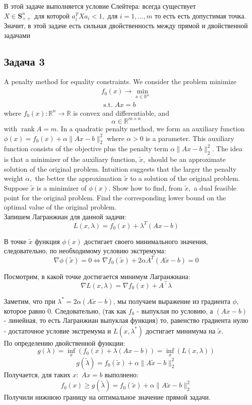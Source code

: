 \documentclass[a4paper,12pt]{article} %
\begin{document}
В этой задаче выполняется условие Слейтера: всегда существует $
X \in \mathbf{S}_{++}^{n} \text { для которой } a_{i}^{T} X a_{i} < 1, \text { для } i=1, \ldots, m
$ то есть есть допустимая точка. Значит, в этой задаче есть сильная двойственность между прямой и двойственной задачами 


\subsection*{Задача 3}
A penalty method for equality constraints. We consider the problem minimize
$$
\begin{array}{l}
f_{0}(x) \rightarrow \min\limits _{x \in \mathbb{R}^{n}} \\
\text { s.t. } A x=b
\end{array}
$$
where $f_{0}(x): \mathbb{R}^{n} \rightarrow \mathbb{R}$ is convex and differentiable, and
$$
\alpha \in \mathbb{R}^{m \times n}
$$
with $\operatorname{rank} A=m .$ In a quadratic penalty method, we form an auxiliary function $\phi(x)=f_{0}(x)+\alpha\|A x-b\|_{2}^{2}$
where $\alpha>0$ is a parameter. This auxiliary function consists of the objective plus the penalty term $\alpha\|A x-b\|_{2}^{2}$. The idea is that a minimizer of the auxiliary function, $\tilde{x},$ should be an approximate solution of the original problem. Intuition suggests that the larger the penalty weight $\alpha,$ the better the approximation $\tilde{x}$ to a solution of the original problem. Suppose $\tilde{x}$ is a minimizer of $\phi(x) .$ Show how to find, from $\tilde{x},$ a dual feasible point for the original problem. Find the corresponding lower bound on the optimal value of the original problem.\\

Запишем Лагранжиан для данной задачи: 
$$
L(x, \lambda)=f_{0}(x)+\lambda^{T}(A x-b)
$$

В точке $\tilde{x}$ функция $\phi(x)$ достигает своего минимального значения, следовательно, по необходимому условию экстремума: $$ \nabla \phi(\tilde{x}) = 0 \Leftrightarrow \nabla f_{0}(\tilde{x})+2 \alpha A^{T}(A \tilde{x}-b)=0$$ 

Посмотрим, в какой точке достигается минимум Лагранжиана: $$ \nabla L(x, \lambda) = \nabla f_{0}(x)+ A^{\top} \lambda $$

Заметим, что при $ \lambda^* = 2 \alpha (A \tilde{x} - b ) $, мы получаем выражение из градиента $ \phi $, которое равно 0. Следовательно, (так как $ f_0 $ - выпуклая по условию, а $(A x - b ) $ - линейная, то есть Лагранжиан выпуклая функция) то, равенство градиента нулю - достаточное условие экстремума и $ L(x, \lambda^*) $ достигает минимума на $ \tilde{x} $.\\
По определению двойственной функции:
$$
g(\lambda)=\inf _{x}\left(f_{0}(x)+\lambda(A x-b)\right) = \inf _{x} (L(x, \lambda))
$$
$$
g(\tilde{\lambda})=f_{0}(\tilde{x})+\alpha\|A \tilde{x}-b\|_{2}^{2}
$$
Получается, для таких $ x: \; Ax = b $ выполнено:
$$
f_{0}(x) \geqslant g(\tilde{\lambda})=f_{0}(\tilde{x})+\alpha\|A \tilde{x}-b\|_{2}^{2}
$$ 
Получили нижнюю границу на оптимальное значение прямой задачи. 
\end{document}
